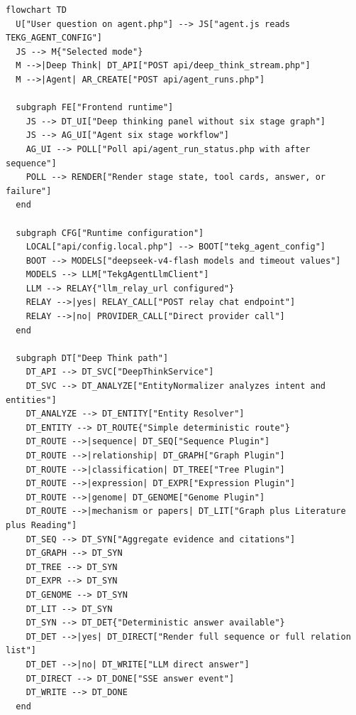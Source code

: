 \documentclass[UTF8]{ctexart}
\begin{document}
\begin{verbatim}
flowchart TD
  U["User question on agent.php"] --> JS["agent.js reads TEKG_AGENT_CONFIG"]
  JS --> M{"Selected mode"}
  M -->|Deep Think| DT_API["POST api/deep_think_stream.php"]
  M -->|Agent| AR_CREATE["POST api/agent_runs.php"]

  subgraph FE["Frontend runtime"]
    JS --> DT_UI["Deep thinking panel without six stage graph"]
    JS --> AG_UI["Agent six stage workflow"]
    AG_UI --> POLL["Poll api/agent_run_status.php with after sequence"]
    POLL --> RENDER["Render stage state, tool cards, answer, or failure"]
  end

  subgraph CFG["Runtime configuration"]
    LOCAL["api/config.local.php"] --> BOOT["tekg_agent_config"]
    BOOT --> MODELS["deepseek-v4-flash models and timeout values"]
    MODELS --> LLM["TekgAgentLlmClient"]
    LLM --> RELAY{"llm_relay_url configured"}
    RELAY -->|yes| RELAY_CALL["POST relay chat endpoint"]
    RELAY -->|no| PROVIDER_CALL["Direct provider call"]
  end

  subgraph DT["Deep Think path"]
    DT_API --> DT_SVC["DeepThinkService"]
    DT_SVC --> DT_ANALYZE["EntityNormalizer analyzes intent and entities"]
    DT_ANALYZE --> DT_ENTITY["Entity Resolver"]
    DT_ENTITY --> DT_ROUTE{"Simple deterministic route"}
    DT_ROUTE -->|sequence| DT_SEQ["Sequence Plugin"]
    DT_ROUTE -->|relationship| DT_GRAPH["Graph Plugin"]
    DT_ROUTE -->|classification| DT_TREE["Tree Plugin"]
    DT_ROUTE -->|expression| DT_EXPR["Expression Plugin"]
    DT_ROUTE -->|genome| DT_GENOME["Genome Plugin"]
    DT_ROUTE -->|mechanism or papers| DT_LIT["Graph plus Literature plus Reading"]
    DT_SEQ --> DT_SYN["Aggregate evidence and citations"]
    DT_GRAPH --> DT_SYN
    DT_TREE --> DT_SYN
    DT_EXPR --> DT_SYN
    DT_GENOME --> DT_SYN
    DT_LIT --> DT_SYN
    DT_SYN --> DT_DET{"Deterministic answer available"}
    DT_DET -->|yes| DT_DIRECT["Render full sequence or full relation list"]
    DT_DET -->|no| DT_WRITE["LLM direct answer"]
    DT_DIRECT --> DT_DONE["SSE answer event"]
    DT_WRITE --> DT_DONE
  end


\end{verbatim}
\end{document}
